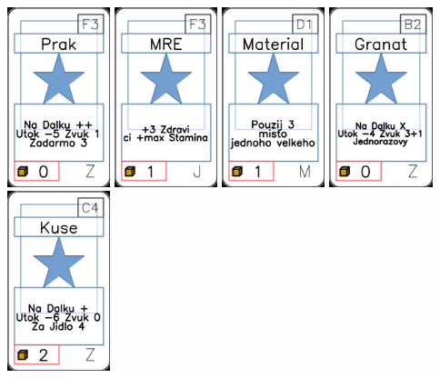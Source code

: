 \documentclass[a4paper]{article}
\begin{document}
	\includegraphics[width=3.0cm]{img-1_87}
	\includegraphics[width=3.0cm]{img-1_27}
	\includegraphics[width=3.0cm]{img-1_45}
	\includegraphics[width=3.0cm]{img-1_96}
	\includegraphics[width=3.0cm]{img-1_103}
\end{document}
